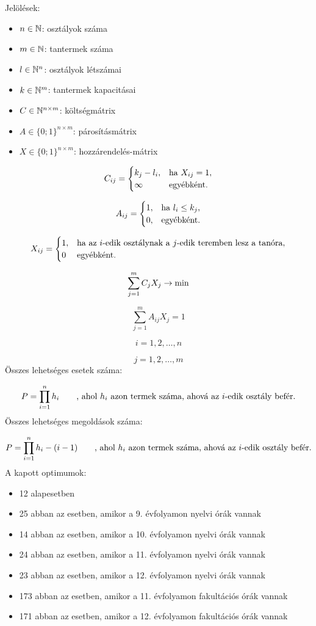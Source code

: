 \documentclass[a4paper,12pt]{article}
\begin{document}
Jelölések:
\begin{itemize}
    \item $n \in \Bbb{N}$: osztályok száma
    \item $m \in \Bbb{N}$: tantermek száma
    \item $l \in \Bbb{N}^n$: osztályok létszámai
    \item $k \in \Bbb{N}^m$: tantermek kapacitásai
    \item $C \in \Bbb{N}^{n \times m}$: költségmátrix
    \item $A \in \{0;1\}^{n \times m}$: párosításmátrix
    \item $X \in \{0;1\}^{n \times m}$: hozzárendelés-mátrix
\end{itemize}

\[
C_{ij} =
\begin{cases}
k_j-l_i, & \hbox{ha } X_{ij}=1, \\
\infty & \hbox{egyébként}.
\end{cases}
\]

\[
A_{ij} =
\begin{cases}
1, & \hbox{ha } l_i \leq k_j, \\
0, & \hbox{egyébként}.
\end{cases}
\]

\[
X_{ij} =
\begin{cases}
1, & \hbox{ha az $i$-edik osztálynak a $j$-edik teremben lesz a tanóra}, \\
0&
\hbox{egyébként}.
\end{cases}
\]

$$\sum_{j=1}^m C_jX_j \rightarrow \hbox{min}$$

$$\sum_{j=1}^m A_{ij}X_j=1$$

$$i=1, 2, \ldots, n$$

$$j=1, 2, \ldots, m$$
Összes lehetséges esetek száma:

$$
P=\prod_{i=1}^n h_i \qquad \hbox{, ahol } h_i \hbox{ azon termek száma, ahová az } i \hbox{-edik osztály befér.}
$$
Összes lehetséges megoldások száma:

$$
P=\prod_{i=1}^n h_i-(i-1) \qquad \hbox{, ahol } h_i \hbox{ azon termek száma, ahová az } i \hbox{-edik osztály befér.}
$$  
A kapott optimumok:
\begin{itemize}
    \item 12 alapesetben
    \item 25 abban az esetben, amikor a 9. évfolyamon nyelvi órák vannak
    \item 14 abban az esetben, amikor a 10. évfolyamon nyelvi órák vannak
    \item 24 abban az esetben, amikor a 11. évfolyamon nyelvi órák vannak
    \item 23 abban az esetben, amikor a 12. évfolyamon nyelvi órák vannak
    \item 173 abban az esetben, amikor a 11. évfolyamon fakultációs órák vannak
    \item 171 abban az esetben, amikor a 12. évfolyamon fakultációs órák vannak
\end{itemize}
\end{document}

